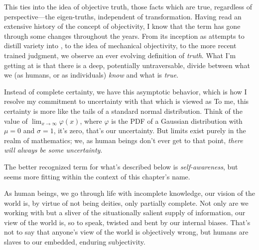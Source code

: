 \documentclass[../butidigress.tex]{subfiles}
\begin{document}
This ties into the idea of objective truth, those facts which are true, regardless of perspective---the eigen-truths, independent of transformation.
Having read an extensive history of the concept of objectivity, I know that the term has gone through some changes throughout the years\autocite{objectivity}.
From its inception as attempts to distill variety into , to the idea of mechanical objectivity, to the more recent trained judgment, we observe an ever evolving definition of \emph{truth}.
What I'm getting at is that there is a deep, potentially untraversable, divide between what we (as humans, or as individuals) \emph{know} and what is \emph{true}.

Instead of complete certainty, we have this asymptotic behavior, which is how I resolve my commitment to uncertainty with that which is viewed as 
To me, this certainty is more like the tails of a standard normal distribution.
Think of the value of $\lim_{x\to\infty}\varphi(x)$, where $\varphi$ is the PDF of a Gaussian distribution with $\mu = 0$ and $\sigma = 1$, it's zero, that's our uncertainty.
But limits exist purely in the realm of mathematics; we, as human beings don't ever get to that point, \emph{there will always be some uncertainty}.

The better recognized term for what's described below is \emph{self-awareness}, but  seems more fitting within the context of this chapter's name.

As human beings, we go through life with incomplete knowledge, our vision of the world is, by virtue of not being deities, only partially complete.
Not only are we working with but a sliver of the situationally salient supply of information, our view of the world is,  so to speak, twisted and bent by our internal biases.
That's not to say that anyone's view of the world is objectively wrong, but humans are slaves to our embedded, enduring subjectivity.
\end{document}

